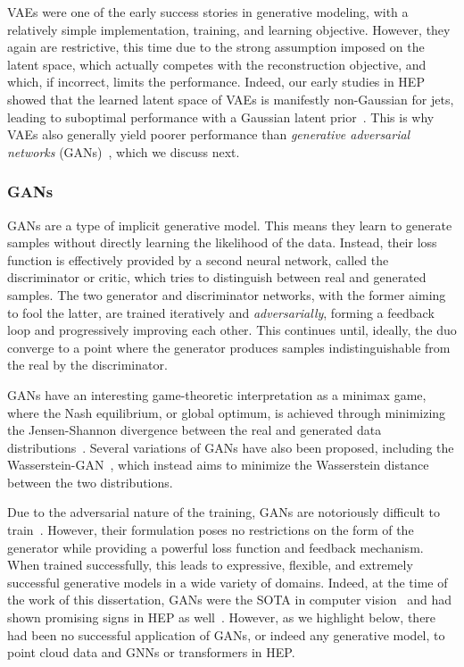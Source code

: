 VAEs were one of the early success stories in generative modeling, with a relatively simple implementation, training, and learning objective.
However, they again are restrictive, this time due to the strong assumption imposed on the latent space, which actually competes with the reconstruction objective, and which, if incorrect, limits the performance.
Indeed, our early studies in HEP showed that the learned latent space of VAEs is manifestly non-Gaussian for jets, leading to suboptimal performance with a Gaussian latent prior~\cite{Orzari_2023}.
This is why VAEs also generally yield poorer performance than \textit{generative adversarial networks} (GANs)~\cite{Goodfellow:2014upx}, which we discuss next.

\subsubsection{GANs}

GANs are a type of implicit generative model.
This means they learn to generate samples without directly learning the likelihood of the data.
Instead, their loss function is effectively provided by a second neural network, called the discriminator or critic, which tries to distinguish between real and generated samples.
The two generator and discriminator networks, with the former aiming to fool the latter, are trained iteratively and \textit{adversarially}, forming a feedback loop and progressively improving each other.
This continues until, ideally, the duo converge to a point where the generator produces samples indistinguishable from the real by the discriminator.

GANs have an interesting game-theoretic interpretation as a minimax game, where the Nash equilibrium, or global optimum, is achieved through minimizing the Jensen-Shannon divergence between the real and generated data distributions~\cite{Goodfellow:2014upx}.
Several variations of GANs have also been proposed, including the Wasserstein-GAN~\cite{arjovsky2017wasserstein}, which instead aims to minimize the Wasserstein distance between the two distributions.

Due to the adversarial nature of the training, GANs are notoriously difficult to train~\cite{salimans2016improved, arjovsky2017towards, arjovsky2017wasserstein, mescheder2018training}.
However, their formulation poses no restrictions on the form of the generator while providing a powerful loss function and feedback mechanism.
When trained successfully, this leads to expressive, flexible, and extremely successful generative models in a wide variety of domains.
Indeed, at the time of the work of this dissertation, GANs were the SOTA in computer vision~\cite{karras2019style, brock2019large, karras2020analyzing} and had shown promising signs in HEP as well~\cite{deOliveira:2017pjk, Paganini:2017dwg, ATL-SOFT-PUB-2018-001, ATL-SOFT-PUB-2020-006, Erdmann:2018jxd, Carminati:2020kym}.
However, as we highlight below, there had been no successful application of GANs, or indeed any generative model, to point cloud data and GNNs or transformers in HEP.

